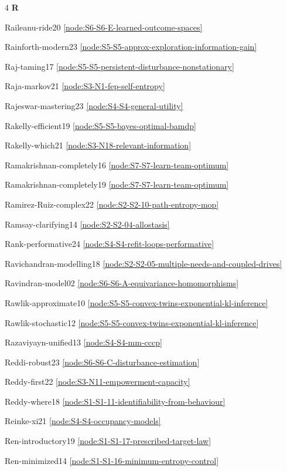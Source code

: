 \documentclass[10pt]{article}
\begin{document}
{\begin{multicols}{4}
\smallskip\textbf{R}\par
Raileanu-ride20 \hfill \ref{node:S6-S6-E-learned-outcome-spaces}\par
Rainforth-modern23 \hfill \ref{node:S5-S5-approx-exploration-information-gain}\par
Raj-taming17 \hfill \ref{node:S5-S5-persistent-disturbance-nonstationary}\par
Raja-markov21 \hfill \ref{node:S3-N1-fep-self-entropy}\par
Rajeswar-mastering23 \hfill \ref{node:S4-S4-general-utility}\par
Rakelly-efficient19 \hfill \ref{node:S5-S5-bayes-optimal-bamdp}\par
Rakelly-which21 \hfill \ref{node:S3-N18-relevant-information}\par
Ramakrishnan-completely16 \hfill \ref{node:S7-S7-learn-team-optimum}\par
Ramakrishnan-completely19 \hfill \ref{node:S7-S7-learn-team-optimum}\par
Ramirez-Ruiz-complex22 \hfill \ref{node:S2-S2-10-path-entropy-mop}\par
Ramsay-clarifying14 \hfill \ref{node:S2-S2-04-allostasis}\par
Rank-performative24 \hfill \ref{node:S4-S4-refit-loops-performative}\par
Ravichandran-modelling18 \hfill \ref{node:S2-S2-05-multiple-needs-and-coupled-drives}\par
Ravindran-model02 \hfill \ref{node:S6-S6-A-equivariance-homomorphisms}\par
Rawlik-approximate10 \hfill \ref{node:S5-S5-convex-twins-exponential-kl-inference}\par
Rawlik-stochastic12 \hfill \ref{node:S5-S5-convex-twins-exponential-kl-inference}\par
Razaviyayn-unified13 \hfill \ref{node:S4-S4-mm-cccp}\par
Reddi-robust23 \hfill \ref{node:S6-S6-C-disturbance-estimation}\par
Reddy-first22 \hfill \ref{node:S3-N11-empowerment-capacity}\par
Reddy-where18 \hfill \ref{node:S1-S1-11-identifiability-from-behaviour}\par
Reinke-xi21 \hfill \ref{node:S4-S4-occupancy-models}\par
Ren-introductory19 \hfill \ref{node:S1-S1-17-prescribed-target-law}\par
Ren-minimized14 \hfill \ref{node:S1-S1-16-minimum-entropy-control}\par

\end{multicols}}
\end{document}
